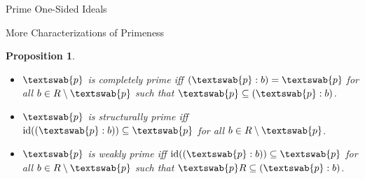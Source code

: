 \documentclass[11pt,a4paper]{article}
\theoremstyle{theorem}
\newtheorem{proposition}[theorem]{Proposition}
\numberwithin{equation}{section}
\begin{document}
\begin{section}{Prime One-Sided Ideals}
\begin{subsection}{More Characterizations of Primeness}
\begin{proposition}
\begin{itemize}
			\item[(2)]  \(\textswab{p}\) is completely prime iff \((\textswab{p}:b) = \textswab{p}\)  for all \(b\in R\setminus \textswab{p}\) such that \(\textswab{p}\subseteq (\textswab{p}:b)\).
			
			\item[(3)]  \(\textswab{p}\) is structurally prime iff \(\operatorname{id}((\textswab{p}:b)) \subseteq \textswab{p}\)  for all \(b\in R\setminus \textswab{p}\).
			\item[(4)] \(\textswab{p}\) is weakly prime iff \(\operatorname{id}((\textswab{p}:b)) \subseteq \textswab{p}\)  for all \(b\in R\setminus \textswab{p}\) such that \(\textswab{p}R\subseteq (\textswab{p}:b)\).
		\end{itemize}
	\end{proposition}

	
	
\end{subsection}


\end{section} 
\end{document}
